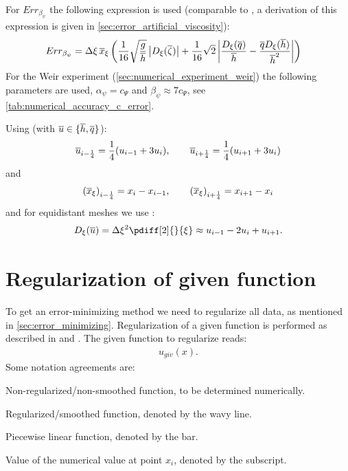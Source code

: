 For $Err_{\beta_{\psi}}$ the following expression is used (comparable to \citet[eq.\ 42]{Borsboom2001}, a derivation of this expression is given in \autoref{sec:error_artificial_viscosity}):
\begin{align}
    &Err_{\beta_{\psi}} = \Delta \xi\, \overline{x}_\xi \left( \frac{1}{16} \sqrt{\frac{g}{\overline{h}}} \left\lvert D_\xi(\overline\zeta) \right\rvert +
    \frac{1}{16} \sqrt{2} \left\lvert \frac{D_\xi(\overline{q})}{\overline{h}} - \frac{\overline{q} D_\xi(\overline{h})}{\overline{h}^2} \right\rvert \right)
\end{align}
For the Weir experiment (\autoref{sec:numerical_experiment_weir}) the following parameters are used, $\alpha_{\psi} = c_{\Psi}$ and $\beta_{\psi} \approx 7 c_{\Psi}$,
see \autoref{tab:numerical_accuracy_c_error}.

Using (with $\overline{u} \in \{\overline{h}, \overline{q}\}$):
\begin{align}
    \overline{u}_{i-\frac{1}{4}} = \frac{1}{4}(u_{i-1} + 3 u_{i}), \qquad \overline{u}_{i+\frac{1}{4}} = \frac{1}{4}(u_{i+1} + 3 u_{i})
\end{align}
and
\begin{align}
    {(\overline{x}_{\xi})}_{i-\frac{1}{4}}= x_i - x_{i-1}, \qquad
    {(\overline{x}_{\xi})}_{i+\frac{1}{4}}= x_{i+1} - x_{i}
\end{align}
and for equidistant meshes we use \citep[eq.\ 35]{Borsboom2001} :
\begin{align}
    D_\xi(\ubar) = \Dxi^2 \pdiff[2]{}{\xi} \approx u_{i-1} - 2 u_{i} + u_{i+1}.
\end{align}
\phantom{text}



\section{Regularization of given function}
To get an error-minimizing method we need to regularize all data, as mentioned in \autoref{sec:error_minimizing}.
Regularization of a given function is performed as described in \citet{Borsboom1998} and \citet{Borsboom2003}.
The given function to regularize reads:
\begin{align}
    u_{giv}(x).
\end{align}
Some notation agreements are:
\begin{symbollist}
    \item[$u$] Non-regularized/non-smoothed function, to be determined numerically.
    \item[$\widetilde u$] Regularized/smoothed function, denoted by the wavy line.
    \item[$\overline u$] Piecewise linear function, denoted by the bar.
    \item[$u_i$] Value of the numerical value at point $x_i$, denoted by the subscript.
\end{symbollist}

